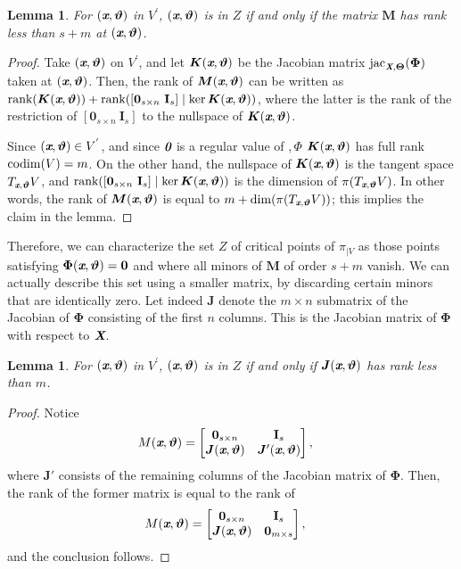 \documentclass[a4paper]{article}
\def\bz{\textit{\textbf{0}}}
\def\Xb{\textit{\textbf{X}}}
\def\Thetab{\bm{\Theta}}
\def\thetab{\bm{\vartheta}}
\def\xb{\textit{\textbf{x}}}
\DeclareMathOperator{\jac}{jac}
\def\dt{s}
\def\bbm{\begin{bmatrix}}
\def\ebm{\end{bmatrix}}
\newtheorem{lemma}[theorem]{Lemma}
\begin{document}
    \begin{lemma} 
      For $(\xb,\thetab)$ in $V^{'}$, $(\xb,\thetab)$ is in $Z$ if and only if
      the matrix $\bm M$ has rank less than $\dt+m$ at $(\xb,\thetab)$.
    \end{lemma}
    \begin{proof}
      Take $(\xb,\thetab)$ on $V^{'}$, and let $\bm K(\xb,\thetab)$ be the
      Jacobian matrix $\jac_{\Xb,\Thetab}(\bm\Phi)$ taken at $(\xb,\thetab)$.
      Then, the rank of $\bm M(\xb,\thetab)$ can be written as
      $\textup{rank}(\bm K(\xb,\thetab)) + \textup{rank}([\textbf{0}_{\dt
          \times n}~\textbf{I}_{\dt}] \mid \ker \bm K(\xb,\thetab))$, where
      the latter is the rank of the restriction of $[\textbf{0}_{\dt
          \times n}~\textbf{I}_{\dt}]$ to the nullspace of
      $\bm K(\xb,\thetab)$.
    
      Since $(\xb,\thetab) \in V^{'}$, and since $\bz$ is a regular value of $\bm, \Phi$ $\bm K(\xb,\thetab)$ has full rank ${\rm codim}
      (V) = m$. On the other hand, the nullspace of $\bm K(\xb,\thetab)$
      is the tangent space $T_{\xb,\thetab} V$, and
      $\textup{rank}([\textbf{0}_{\dt \times n}~\textbf{I}_{\dt}] \mid
      \ker \bm K(\xb,\thetab))$ is the dimension of $\pi(T_{\xb,\thetab}
      V)$.  In other words, the rank of $\bm M(\xb,\thetab)$ is equal to
      $m+\dim(\pi(T_{\xb,\thetab} V))$; this implies the claim in the
      lemma.
    \end{proof}



    Therefore, we can characterize the set $Z$ of critical points of
    $\pi_{|V}$ as those points satisfying $\bm\Phi(\xb,\thetab)=\bm 0$ and
    where all minors of $\bm M$ of order $\dt+m$ vanish. We can actually
    describe this set using a smaller matrix, by discarding certain minors
    that are identically zero. Let indeed $\bm J$ denote the $m \times n$
    submatrix of the Jacobian of $\bm\Phi$ consisting of the first $n$
    columns. This is the Jacobian matrix of $\bm \Phi$ with respect to $\Xb$.
    \begin{lemma} 
      For $(\xb,\thetab)$ in $V^{'}$, $(\xb,\thetab)$ is in $Z$ if and only if
      $\bm J(\xb,\thetab)$ has rank less than $m$.
    \end{lemma}
    \begin{proof}
    Notice 
    \begin{align*}
    M(\xb,\thetab)&= 
    \bbm 
    \textbf{0}_{\dt \times n} &\textbf{I}_{\dt} \\
    \bm J(\xb,\thetab)     &\bm J'(\xb,\thetab)
    \ebm,
    \end{align*}
    where $\bm J'$ consists of the remaining columns of the Jacobian matrix of
    $\bm\Phi$.  Then, the rank of the former matrix is equal to the rank
    of
    \begin{align*}
    M(\xb,\thetab)&= 
    \bbm 
    \textbf{0}_{\dt \times n} &\textbf{I}_{\dt} \\
    \bm J(\xb,\thetab)     & \bm 0_{m \times s}
    \ebm,
    \end{align*}
    and the conclusion follows.
    \end{proof}
\end{document}
